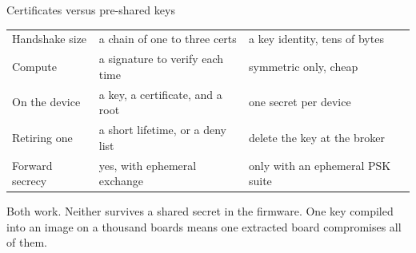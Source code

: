 \documentclass[10pt,aspectratio=169,t]{beamer}
\begin{document}
\begin{frame}[embedded,eyebrow=Trust]{Certificates versus pre-shared keys}
  \vskip 1mm
  { \begin{tabular}{@{}l>{\raggedright\arraybackslash}p{42mm}>{\raggedright\arraybackslash}p{44mm}@{}}
    \toprule
    \thead{} & \multicolumn{1}{l}{\thead{X.509 certificates}} & \multicolumn{1}{l@{}}{\thead{Pre-shared keys}} \\
    \midrule
    Handshake size & a chain of one to three certs & a key identity, tens of bytes \\
    Compute        & a signature to verify each time & symmetric only, cheap \\
    On the device  & a key, a certificate, and a root & one secret per device \\
    Retiring one   & a short lifetime, or a deny list & delete the key at the broker \\
    Forward secrecy & yes, with ephemeral exchange & only with an ephemeral PSK suite \\
    \bottomrule
  \end{tabular}}
  \begin{takeaway}{Both work. Neither survives a shared secret in the firmware.}
    One key compiled into an image on a thousand boards means one extracted board compromises all of them.
  \end{takeaway}
\end{frame}
\end{document}
